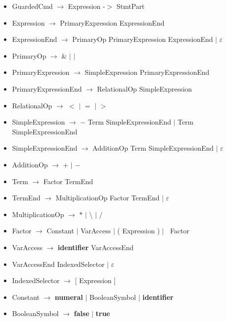 \documentclass{article}
\let\bf\textbf
\newcommand{\der}{$\longrightarrow$ }
\newcommand{\es}{$\varepsilon$ }
\newcommand{\alt}{\Large$|$ \normalsize }
\begin{document}
\begin{itemize}[label={}]
    \item GuardedCmd \der Expression -$>$ StmtPart
    \item Expression \der PrimaryExpression ExpressionEnd
    \item ExpressionEnd \der PrimaryOp PrimaryExpression ExpressionEnd \alt \es
    \item PrimaryOp \der $\&$ \alt $|$
    \item PrimaryExpression \der SimpleExpression PrimaryExpressionEnd
    \item PrimaryExpressionEnd \der RelationalOp SimpleExpression
    \item RelationalOp \der $<$ \alt $=$ \alt $>$
    \item SimpleExpression \der $-$ Term SimpleExpressionEnd \alt Term SimpleExpressionEnd
    \item SimpleExpressionEnd \der AdditionOp Term SimpleExpressionEnd \alt \es
    \item AdditionOp \der $+$ \alt $-$
    \item Term \der Factor TermEnd
    \item TermEnd \der MultiplicationOp Factor TermEnd \alt \es
    \item MultiplicationOp \der $*$ \alt \textbackslash\: \alt $/$ 
    \item Factor \der Constant \alt VarAccess \alt ( Expression ) \alt $~$ Factor
    \item VarAccess \der \bf{identifier} VarAccessEnd 
    \item VarAccessEnd IndexedSelector \alt \es
    \item IndexedSelector \der [ Expression ]
    \item Constant \der \bf{numeral} \alt BooleanSymbol \alt \bf{identifier}
    \item BooleanSymbol \der \bf{false} \alt \bf{true}
\end{itemize}
\end{document}
